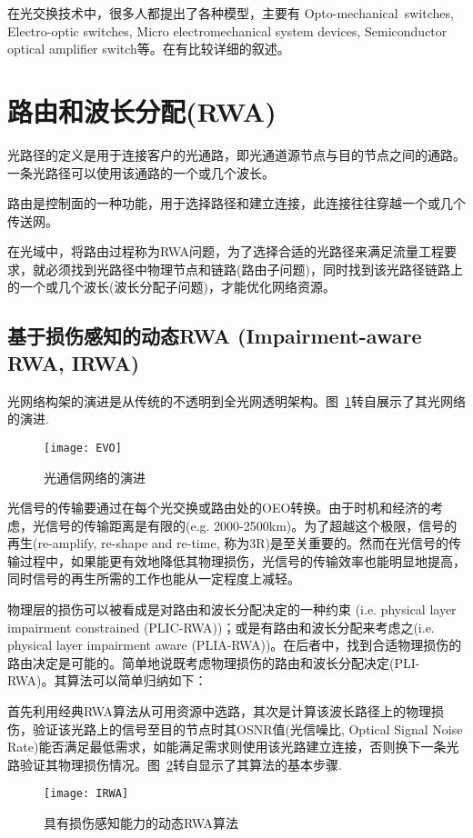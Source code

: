 \documentclass[11pt,twocolumn]{ctexart}
\begin{document}
在光交换技术中，很多人都提出了各种模型，主要有 Opto-mechanical switches, Electro-optic switches,  Micro electromechanical system devices, Semiconductor optical amplifier switch等。在\cite{5,7}有比较详细的叙述。

\section{路由和波长分配(RWA)}
光路径的定义是用于连接客户的光通路，即光通道源节点与目的节点之间的通路。一条光路径可以使用该通路的一个或几个波长。

路由是控制面的一种功能，用于选择路径和建立连接，此连接往往穿越一个或几个传送网。

在光域中，将路由过程称为RWA问题，为了选择合适的光路径来满足流量工程要求，就必须找到光路径中物理节点和链路(路由子问题)，同时找到该光路径链路上的一个或几个波长(波长分配子问题)，才能优化网络资源。

\subsection{基于损伤感知的动态RWA (Impairment-aware RWA, IRWA)}
光网络构架的演进是从传统的不透明到全光网透明架构。图~\ref{EVO}转自\cite{1}展示了其光网络的演进.
\begin{figure}[!hbtp]
  \begin{center}
  \texttt{[image: EVO]}
  \end{center}
  \caption{光通信网络的演进}
  \label{EVO}
\end{figure}

光信号的传输要通过在每个光交换或路由处的OEO转换。由于时机和经济的考虑，光信号的传输距离是有限的(e.g. 2000-2500km)。为了超越这个极限，信号的再生(re-amplify, re-shape and re-time, 称为3R)是至关重要的。然而在光信号的传输过程中，如果能更有效地降低其物理损伤，光信号的传输效率也能明显地提高，同时信号的再生所需的工作也能从一定程度上减轻。

物理层的损伤可以被看成是对路由和波长分配决定的一种约束 (i.e. physical layer impairment constrained (PLIC-RWA))；或是有路由和波长分配来考虑之(i.e. physical layer impairment aware (PLIA-RWA))。在后者中，找到合适物理损伤的路由决定是可能的。简单地说既考虑物理损伤的路由和波长分配决定(PLI-RWA)。其算法可以简单归纳如下：

首先利用经典RWA算法从可用资源中选路，其次是计算该波长路径上的物理损伤，验证该光路上的信号至目的节点时其OSNR值(光信噪比, Optical Signal Noise Rate)能否满足最低需求，如能满足需求则使用该光路建立连接，否则换下一条光路验证其物理损伤情况。图~\ref{IRWA}转自\cite{8}显示了其算法的基本步骤.
\begin{figure}[!hbtp]
  \begin{center}
  \texttt{[image: IRWA]}
  \end{center}
  \caption{具有损伤感知能力的动态RWA算法}
  \label{IRWA}
\end{figure}
\end{document}
